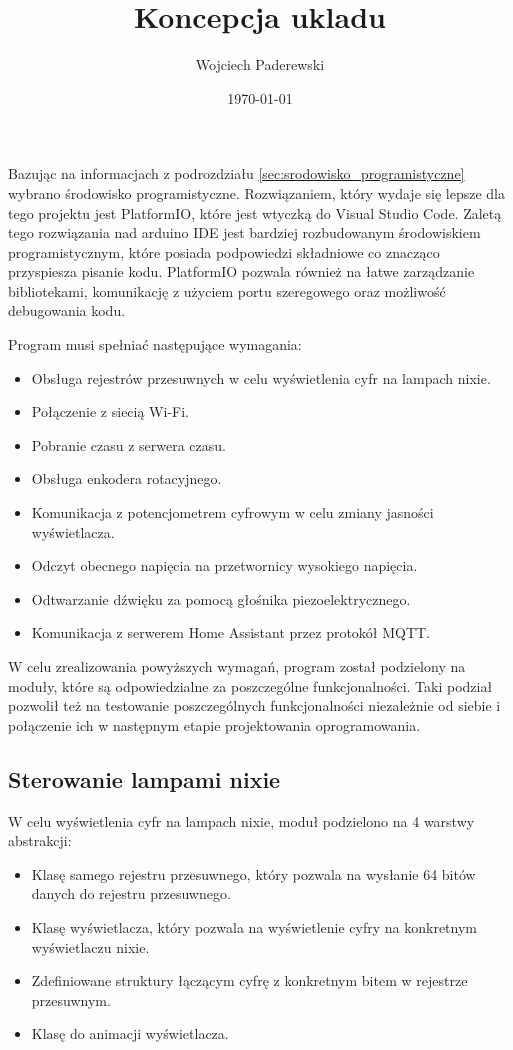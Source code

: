 \documentclass[../main.tex]{subfiles}
\author{Wojciech Paderewski}
\date{\today}
\title{Koncepcja ukladu}
\begin{document}
Bazując na informacjach z podrozdziału \ref{sec:srodowisko_programistyczne} wybrano środowisko programistyczne.
Rozwiązaniem, który wydaje się lepsze dla tego projektu jest PlatformIO, które jest wtyczką do Visual Studio Code. Zaletą tego rozwiązania nad arduino IDE jest bardziej rozbudowanym środowiskiem programistycznym, 
które posiada podpowiedzi składniowe co znacząco przyspiesza pisanie kodu.
PlatformIO pozwala również na łatwe zarządzanie bibliotekami, komunikację z użyciem portu szeregowego oraz możliwość debugowania kodu.

Program musi spełniać następujące wymagania:
\begin{itemize}
  \item Obsługa rejestrów przesuwnych w celu wyświetlenia cyfr na lampach nixie.
  \item Połączenie z siecią Wi-Fi.
  \item Pobranie czasu z serwera czasu.
  \item Obsługa enkodera rotacyjnego.
  \item Komunikacja z potencjometrem cyfrowym w celu zmiany jasności wyświetlacza.
  \item Odczyt obecnego napięcia na przetwornicy wysokiego napięcia.
  \item Odtwarzanie dźwięku za pomocą głośnika piezoelektrycznego.
  \item Komunikacja z serwerem Home Assistant przez protokół MQTT.
\end{itemize}

W celu zrealizowania powyższych wymagań, program został podzielony na moduły, które są odpowiedzialne za poszczególne funkcjonalności.
Taki podział pozwolił też na testowanie poszczególnych funkcjonalności niezależnie od siebie i połączenie ich w następnym etapie projektowania oprogramowania.

\subsection{Sterowanie lampami nixie}
W celu wyświetlenia cyfr na lampach nixie, moduł podzielono na 4 warstwy abstrakcji:
\begin{itemize}
  \item Klasę samego rejestru przesuwnego, który pozwala na wysłanie 64 bitów danych do rejestru przesuwnego.
  \item Klasę wyświetlacza, który pozwala na wyświetlenie cyfry na konkretnym wyświetlaczu nixie.
  \item Zdefiniowane struktury łączącym cyfrę z konkretnym bitem w rejestrze przesuwnym.
  \item Klasę do animacji wyświetlacza.
\end{itemize}
\end{document}
